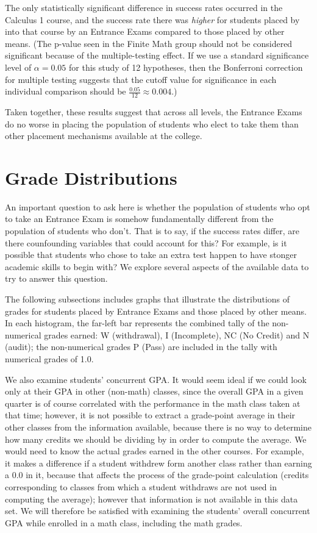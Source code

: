 \documentclass[twoside]{article}\usepackage[]{graphicx}\usepackage[]{color}
\begin{document}
The only statistically significant difference in success rates occurred in the Calculus 1 course, and the success rate there was {\it higher} for students placed by into that course by an Entrance Exams compared to those placed by other means.  (The p-value seen in the Finite Math group should not be considered significant because of the multiple-testing effect.  If we use a standard significance level of $\alpha = 0.05$ for this study of 12 hypotheses, then the Bonferroni correction for multiple testing suggests that the cutoff value for significance in each individual comparison should be $\frac{0.05}{12} \approx 0.004$.)


Taken together, these results suggest that across all levels, the Entrance Exams do no worse in placing the population of students who elect to take them than other placement mechanisms available at the college.


\section{Grade Distributions}

An important question to ask here is whether the population of students who opt to take an Entrance Exam is somehow fundamentally different from the population of students who don't.  That is to say, if the success rates differ, are there counfounding variables that could account for this?  For example, is it possible that students who chose to take an extra test happen to have stonger academic skills to begin with?  We explore several aspects of the available data to try to answer this question.

The following subsections includes graphs that illustrate the distributions of grades for students placed by Entrance Exams and those placed by other means.  In each histogram, the far-left bar represents the combined tally of the non-numerical grades earned: W (withdrawal), I (Incomplete), NC (No Credit) and N (audit); the non-numerical grades P (Pass) are included in the tally with numerical grades of 1.0.

We also examine students' concurrent GPA.  It would seem ideal if we could look only at their GPA in other (non-math) classes, since the overall GPA in a given quarter is of course correlated with the performance in the math class taken at that time; however, it is not possible to extract a grade-point average in their other classes from the information available, because there is no way to determine how many credits we should be dividing by in order to compute the average.  We would need to know the actual grades earned in the other courses.  For example, it makes a difference if a student withdrew form another class rather than earning a 0.0 in it, because that affects the process of the grade-point calculation (credits corresponding to classes from which a student withdraws are not used in computing the average); however that information is not available in this data set.  We will therefore be satisfied with examining the students' overall concurrent GPA while enrolled in a math class, including the math grades.
\end{document}
